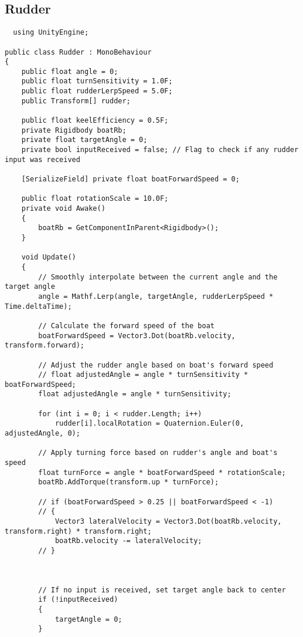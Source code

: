 \subsection{Rudder}\label{sec:rudder}

\begin{lstlisting}
  using UnityEngine;

public class Rudder : MonoBehaviour
{
    public float angle = 0;
    public float turnSensitivity = 1.0F;
    public float rudderLerpSpeed = 5.0F;
    public Transform[] rudder;

    public float keelEfficiency = 0.5F;
    private Rigidbody boatRb;
    private float targetAngle = 0;
    private bool inputReceived = false; // Flag to check if any rudder input was received

    [SerializeField] private float boatForwardSpeed = 0;

    public float rotationScale = 10.0F;
    private void Awake()
    {
        boatRb = GetComponentInParent<Rigidbody>();
    }

    void Update()
    {
        // Smoothly interpolate between the current angle and the target angle
        angle = Mathf.Lerp(angle, targetAngle, rudderLerpSpeed * Time.deltaTime);

        // Calculate the forward speed of the boat
        boatForwardSpeed = Vector3.Dot(boatRb.velocity, transform.forward);

        // Adjust the rudder angle based on boat's forward speed
        // float adjustedAngle = angle * turnSensitivity * boatForwardSpeed;
        float adjustedAngle = angle * turnSensitivity;

        for (int i = 0; i < rudder.Length; i++)
            rudder[i].localRotation = Quaternion.Euler(0, adjustedAngle, 0);

        // Apply turning force based on rudder's angle and boat's speed
        float turnForce = angle * boatForwardSpeed * rotationScale;
        boatRb.AddTorque(transform.up * turnForce);

        // if (boatForwardSpeed > 0.25 || boatForwardSpeed < -1)
        // {
            Vector3 lateralVelocity = Vector3.Dot(boatRb.velocity, transform.right) * transform.right;
            boatRb.velocity -= lateralVelocity;
        // }
        


        // If no input is received, set target angle back to center
        if (!inputReceived)
        {
            targetAngle = 0;
        }


\end{lstlisting}
